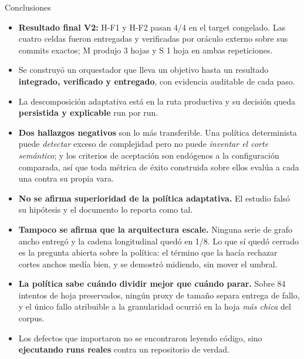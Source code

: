 \documentclass[10pt,aspectratio=169]{beamer}
\begin{document}
\begin{frame}[shrink=10]{Conclusiones}
  \begin{itemize}
    \item \textbf{Resultado final V2:} H-F1 y H-F2 pasan 4/4 en el target
      congelado. Las cuatro celdas fueron entregadas y verificadas por oráculo
      externo sobre sus commits exactos; M produjo 3 hojas y S 1 hoja en ambas
      repeticiones.
    \item Se construyó un orquestador que lleva un objetivo hasta un resultado
      \textbf{integrado, verificado y entregado}, con evidencia auditable de
      cada paso.
    \item La descomposición adaptativa está en la ruta productiva y su decisión
      queda \textbf{persistida y explicable} run por run.
    \item \textbf{Dos hallazgos negativos} son lo más transferible. Una política
      determinista puede \emph{detectar} exceso de complejidad pero no puede
      \emph{inventar el corte semántico}; y los criterios de aceptación son
      endógenos a la configuración comparada, así que toda métrica de éxito
      construida sobre ellos evalúa a cada una contra su propia vara.
    \item \textbf{No se afirma superioridad de la política adaptativa.} El
      estudio falsó su hipótesis y el documento lo reporta como tal.
    \item \textbf{Tampoco se afirma que la arquitectura escale.} Ninguna serie
      de grafo ancho entregó y la cadena longitudinal quedó en 1/8. Lo que sí
      quedó cerrado es la pregunta abierta sobre la política: el término que la
      hacía rechazar cortes anchos medía bien, y se demostró midiendo, sin mover
      el umbral.
    \item \textbf{La política sabe cuándo dividir mejor que cuándo parar.} Sobre
      84 intentos de hoja preservados, ningún proxy de tamaño separa entrega de
      fallo, y el único fallo atribuible a la granularidad ocurrió en la hoja
      \emph{más chica} del corpus.
    \item Los defectos que importaron no se encontraron leyendo código, sino
      \textbf{ejecutando runs reales} contra un repositorio de verdad.
  \end{itemize}
\end{frame}
\end{document}
